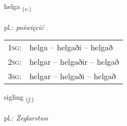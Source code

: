 \documentclass[frontgrid, backgrid]{flacards}\usepackage[]{graphicx}\usepackage[]{xcolor}
\begin{document}
\renewcommand{\flhead}{\vskip5pt \fboxsep=0pt {\small\bfseries\footnotesize Sagnorð | czasownik}}
\renewcommand{\fcfoot}{\vskip5pt \fboxsep=0pt \hspace{2pt}{\small\bfseries\footnotesize 3K}}

\renewcommand{\blhead}{\vskip5pt {\small\bfseries\footnotesize Sagnorð | czasownik }}
\renewcommand{\bcfoot}{\vskip5pt \hspace{2pt}{\small\bfseries\footnotesize 3K}}


{helga \small{\textsubscript{(\textit{v.})}} \\[1ex] %
\textphonetic{[hɛlka]} \\
pl.: \emph{poświęcić} \\  [2ex]
\renewcommand*{\arraystretch}{0.8}
\begin{tabular}{p{1cm}l}
\textsc{1sg}: & helga -- helgaði -- helgað \\ 
\textsc{2sg}: & helgar -- helgaðir -- helgað \\ 
\textsc{3sg}: & helgar -- helgaði -- helgað \\ 
\end{tabular}
}

\renewcommand{\flhead}{\vskip5pt \fboxsep=0pt {\small\bfseries\footnotesize Nafnorð | rzeczownik}}
\renewcommand{\fcfoot}{\vskip5pt \fboxsep=0pt \hspace{2pt}{\small\bfseries\footnotesize 3K}}

\renewcommand{\blhead}{\vskip5pt {\small\bfseries\footnotesize Nafnorð | rzeczownik }}
\renewcommand{\bcfoot}{\vskip5pt \hspace{2pt}{\small\bfseries\footnotesize 3K}}


{sigling \small{\textsubscript{(\textit{f.})}} \\[1ex] %
\textphonetic{[sɪkliŋk]} \\
pl.: \emph{Żeglarstwo} \\  [2ex]
\renewcommand*{\arraystretch}{0.8}
}
\end{document}
